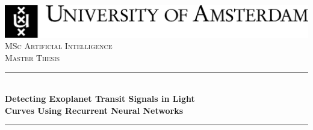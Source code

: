 \begin{titlepage}



\newcommand{\HRule}{\rule{\linewidth}{0.5mm}} %

\center %

 






\includegraphics[width=\linewidth]{Titlepage/UvA-logo/uvalogo_regular_p_en.jpg}\\[2.5cm]

\textsc{\Large MSc Artificial Intelligence}\\[0.2cm]

\textsc{\Large Master Thesis}\\[0.5cm] 








\HRule \\[0.4cm]

{ \huge \bfseries Detecting Exoplanet Transit Signals in Light\\ Curves Using Recurrent Neural Networks}\\[0.4cm] %

\HRule \\[0.5cm]


 



\end{titlepage}
